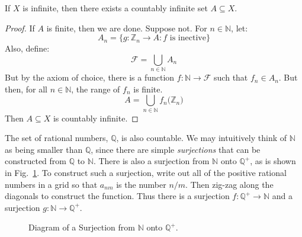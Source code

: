             \begin{theorem}
                If $X$ is infinite, then there exists a
                countably infinite set $A\subseteq{X}$.
            \end{theorem}
            \begin{proof}
                If $A$ is finite, then we are done. Suppose not.
                For $n\in\mathbb{N}$, let:
                \begin{equation}
                    A_{n}
                    =\{g:\mathbb{Z}_{n}\rightarrow{A}:f\textrm{ is inective}\}
                \end{equation}
                Also, define:
                \begin{equation}
                    \mathcal{F}=\bigcup_{n\in\mathbb{N}}A_{n}
                \end{equation}
                But by the axiom of choice, there is a function
                $f:\mathbb{N}\rightarrow\mathcal{F}$ such that
                $f_{n}\in{A}_{n}$. But then, for all
                $n\in\mathbb{N}$, the range of $f_{n}$ is finite.
                \begin{equation}
                    A=\bigcup_{n\in\mathbb{N}}f_{n}
                        \Big(\mathbb{Z}_{n}\Big)
                \end{equation}
                Then $A\subseteq{X}$ is countably infinite.
            \end{proof}
            The set of rational numbers, $\mathbb{Q}$, is also
            countable. We may intuitively think of $\mathbb{N}$
            as being smaller than $\mathbb{Q}$, since there are
            simple \textit{surjections} that can be constructed
            from $\mathbb{Q}$ to $\mathbb{N}$. There is also a
            surjection from $\mathbb{N}$ onto $\mathbb{Q}^{+}$,
            as is shown in Fig.~\ref{fig:Bijection_N_and_Q_Plus}.
            To construct such a surjection, write out all of the
            positive rational numbers in a grid so that $a_{nm}$
            is the number $n/m$. Then zig-zag along the diagonals
            to construct the function. Thus there is a surjection
            $f:\mathbb{Q}^{+}\rightarrow\mathbb{N}$
            and a surjection
            $g:\mathbb{N}\rightarrow\mathbb{Q}^{+}$.
            \begin{figure}[H]
                \centering
                \captionsetup{type=figure}
                \resizebox{0.7\textwidth}{!}{%
                    
                }
                \caption{Diagram of a Surjection from
                         $\mathbb{N}$ onto $\mathbb{Q}^{+}$.}
                \label{fig:Bijection_N_and_Q_Plus}
            \end{figure}
